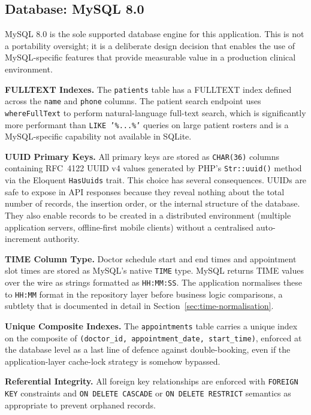 \subsection{Database: MySQL 8.0}

MySQL 8.0 is the sole supported database engine for this application.
This is not a portability oversight; it is a deliberate design decision
that enables the use of MySQL-specific features that provide measurable
value in a production clinical environment.

\textbf{FULLTEXT Indexes.} The \texttt{patients} table has a FULLTEXT
index defined across the \texttt{name} and \texttt{phone} columns. The
patient search endpoint uses \texttt{whereFullText} to perform
natural-language full-text search, which is significantly more
performant than \texttt{LIKE '\%...\%'} queries on large patient rosters
and is a MySQL-specific capability not available in SQLite.

\textbf{UUID Primary Keys.} All primary keys are stored as
\texttt{CHAR(36)} columns containing RFC~4122 UUID v4 values generated
by PHP's \texttt{Str::uuid()} method via the Eloquent
\texttt{HasUuids} trait. This choice has several consequences. UUIDs are
safe to expose in API responses because they reveal nothing about the
total number of records, the insertion order, or the internal
structure of the database. They also enable records to be created in a
distributed environment (multiple application servers, offline-first
mobile clients) without a centralised auto-increment authority.

\textbf{TIME Column Type.} Doctor schedule start and end times and
appointment slot times are stored as MySQL's native \texttt{TIME} type.
MySQL returns TIME values over the wire as strings formatted as
\texttt{HH:MM:SS}. The application normalises these to \texttt{HH:MM}
format in the repository layer before business logic comparisons, a
subtlety that is documented in detail in
Section~\ref{sec:time-normalisation}.

\textbf{Unique Composite Indexes.} The \texttt{appointments} table
carries a unique index on the composite of
\texttt{(doctor\_id, appointment\_date, start\_time)}, enforced at the
database level as a last line of defence against double-booking, even if
the application-layer cache-lock strategy is somehow bypassed.

\textbf{Referential Integrity.} All foreign key relationships are
enforced with \texttt{FOREIGN KEY} constraints and
\texttt{ON DELETE CASCADE} or \texttt{ON DELETE RESTRICT} semantics as
appropriate to prevent orphaned records.

